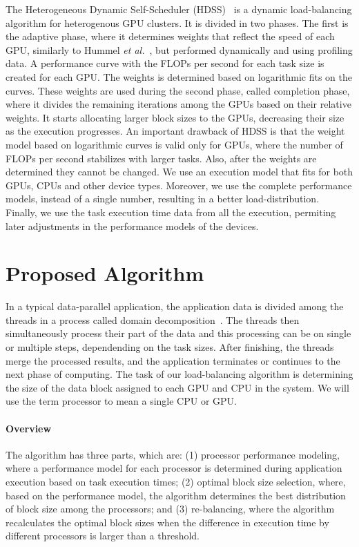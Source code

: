 \documentclass[journal]{IEEEtran}
\begin{document}
The Heterogeneous Dynamic Self-Scheduler (HDSS)~\cite{HDSS} is a dynamic
load-balancing algorithm for heterogenous GPU clusters. It is divided in two
phases. The first is the adaptive phase, where it determines weights that
reflect the speed of each GPU, similarly to Hummel \emph{et al.}~\cite{Hummel},
but performed dynamically and using profiling data. A performance curve with the
FLOPs per second for each task size is created for each GPU. The weights is
determined based on logarithmic fits on the curves.  These weights are used
during the second phase, called completion phase, where it divides the remaining
iterations among the GPUs based on their relative weights. It starts allocating
larger block sizes to the GPUs, decreasing their size as the execution
progresses. An important drawback of HDSS is that the weight model based on
logarithmic curves is valid only for GPUs, where the number of FLOPs per second
stabilizes with larger tasks. Also, after the weights are determined they cannot
be changed. We use an execution model that fits for both GPUs, CPUs and other
device types. Moreover, we use the complete performance models, instead of a
single number, resulting in a better load-distribution. Finally, we use the task
execution time data from all the execution, permiting later adjustments in the
performance models of the devices.



\section{Proposed Algorithm}

In a typical data-parallel application, the application data is divided among
the threads in a process called domain decomposition~\cite{Gropp:1992uq}. The
threads then simultaneously process their part of the data and this processing
can be on single or multiple steps, dependending on the task sizes. After
finishing, the threads merge the processed results, and the application
terminates or continues to the next phase of computing. The task of our
load-balancing algorithm is determining the size of the data block assigned to
each GPU and CPU in the system. We will use the term processor to mean a single
CPU or GPU.

\vspace{0.2cm}
\paragraph*{Overview} The algorithm has three parts, which are: (1) processor 
performance modeling, where a performance model for each processor is determined
during application execution based on task execution times; (2) optimal block
size selection, where, based on the performance model, the algorithm determines
the best distribution of block size among the processors; and (3) re-balancing,
where the algorithm recalculates the optimal block sizes when the difference in
execution time by different processors is larger than a threshold.
\end{document}
